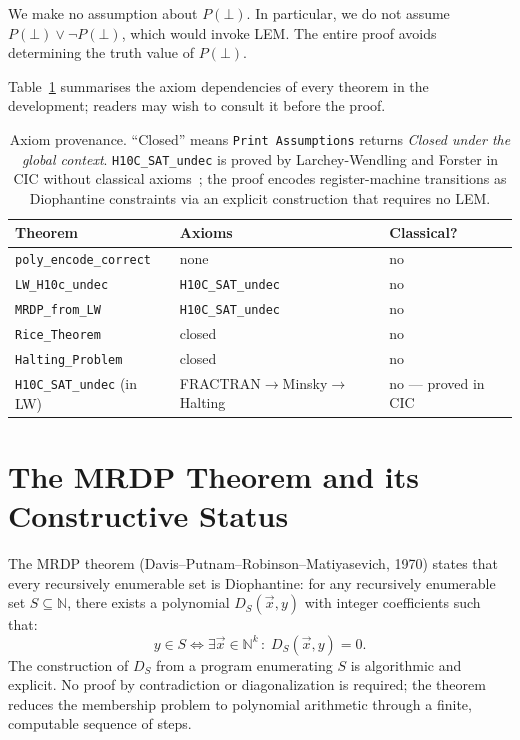 \documentclass{lmcs}
\begin{document}
\begin{rem}
We make no assumption about \(P(\bot)\). In particular, we do not assume
\(P(\bot) \vee \neg P(\bot)\), which would invoke LEM. The entire proof avoids
determining the truth value of \(P(\bot)\).
\end{rem}

Table~\ref{tab:axioms} summarises the axiom dependencies of every theorem
in the development; readers may wish to consult it before the proof.

\begin{table}[h]
\centering
\small
\begin{tabular}{lll}
\toprule
\textbf{Theorem} & \textbf{Axioms} & \textbf{Classical?} \\
\midrule
\texttt{poly\_encode\_correct} & none & no \\
\texttt{LW\_H10c\_undec} & \texttt{H10C\_SAT\_undec} & no \\
\texttt{MRDP\_from\_LW} & \texttt{H10C\_SAT\_undec} & no \\
\texttt{Rice\_Theorem} & closed & no \\
\texttt{Halting\_Problem} & closed & no \\
\midrule
\texttt{H10C\_SAT\_undec} (in LW) & FRACTRAN$\to$Minsky$\to$Halting & no --- proved in CIC \\
\bottomrule
\end{tabular}
\caption{Axiom provenance. ``Closed'' means \texttt{Print Assumptions}
returns \emph{Closed under the global context}.
\texttt{H10C\_SAT\_undec} is proved by Larchey-Wendling and Forster
in CIC without classical axioms~\cite{larchey2022}; the proof encodes
register-machine transitions as Diophantine constraints via an explicit
construction that requires no LEM.}
\label{tab:axioms}
\end{table}

\section{The MRDP Theorem and its Constructive Status}
\label{sec:mrdp}

The MRDP theorem (Davis--Putnam--Robinson--Matiyasevich, 1970) states that every
recursively enumerable set is Diophantine: for any recursively enumerable set
\(S \subseteq \mathbb{N}\), there exists a polynomial \(D_S(\vec{x}, y)\) with
integer coefficients such that:
\[
  y \in S \iff \exists \vec{x} \in \mathbb{N}^k\,:\; D_S(\vec{x}, y) = 0.
\]
The construction of \(D_S\) from a program enumerating \(S\) is algorithmic and
explicit. No proof by contradiction or diagonalization is required; the theorem
reduces the membership problem to polynomial arithmetic through a finite,
computable sequence of steps.
\end{document}
